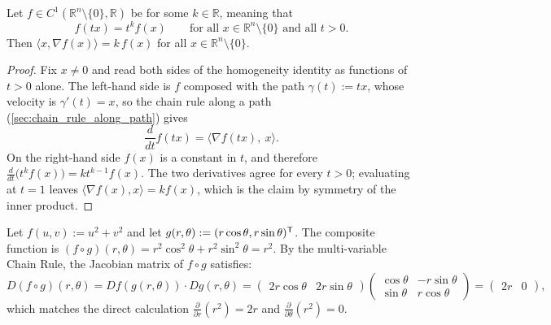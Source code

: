\begin{theorem}
\label{thm:eulers_homogeneous_function_theorem}
Let $f \in C^1(\mathbb{R}^n\setminus\{0\},\mathbb{R})$ be  for some $k \in \mathbb{R}$, meaning that
\[f(tx) = t^kf(x) \qquad \text{for all } x \in \mathbb{R}^n\setminus\{0\} \text{ and all } t>0.\]
Then $\langle x, \nabla f(x)\rangle = k\,f(x)$ for all $x \in \mathbb{R}^n\setminus\{0\}$.
\end{theorem}

\begin{proof}
Fix $x \neq 0$ and read both sides of the homogeneity identity as functions of $t>0$ alone. The
left-hand side is $f$ composed with the path $\gamma(t) := tx$, whose velocity is
$\gamma'(t) = x$, so the chain rule along a path (\cref{sec:chain_rule_along_path}) gives
\[\frac{d}{dt}f(tx) = \big\langle \nabla f(tx),\ x\big\rangle.\]
On the right-hand side $f(x)$ is a constant in $t$, and therefore
$\frac{d}{dt}\big(t^kf(x)\big) = kt^{k-1}f(x)$. The two derivatives agree for every $t>0$;
evaluating at $t=1$ leaves $\langle \nabla f(x), x\rangle = k f(x)$, which is the claim by
symmetry of the inner product.
\end{proof}

\begin{aiexample}
Let $f(u,v) := u^2 + v^2$ and let $g(r,\theta) := (r\cos\theta, r\sin\theta)^{\mathsf{T}}$. The composite function is $(f \circ g)(r,\theta) = r^2\cos^2\theta + r^2\sin^2\theta = r^2$.
By the multi-variable Chain Rule, the Jacobian matrix of $f \circ g$ satisfies:
\[
D(f \circ g)(r,\theta) = Df(g(r,\theta)) \cdot Dg(r,\theta) = \begin{pmatrix} 2r\cos\theta & 2r\sin\theta \end{pmatrix} \begin{pmatrix} \cos\theta & -r\sin\theta \\ \sin\theta & r\cos\theta \end{pmatrix} = \begin{pmatrix} 2r & 0 \end{pmatrix},
\]
which matches the direct calculation $\frac{\partial}{\partial r}(r^2) = 2r$ and $\frac{\partial}{\partial \theta}(r^2) = 0$.
\end{aiexample}

